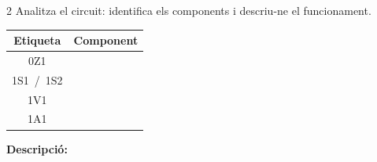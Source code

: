 \begin{exercici}[12]{2}
Analitza el circuit: identifica els components i descriu-ne el funcionament.
\begin{center}\circuitD\end{center}
\begin{center}
\renewcommand{\arraystretch}{2.0}
\begin{tabular}{|c|p{10cm}|}\hline
\textbf{Etiqueta} & \textbf{Component}\\\hline 0Z1 & \\\hline 1S1 \,/\, 1S2 & \\\hline 1V1 & \\\hline 1A1 & \\\hline
\end{tabular}
\end{center}
\textbf{Descripció:}
\end{exercici}

\newcommand{\circuitE}{%
\begin{tikzpicture}[x=1cm,y=1cm]
 \pncyl{a}{1.5}{6.0}{d}
 \pnvalve{v}{1.0}{3.2}{52}{pilot}{spring}
 \pnbutton{s1}{-2.2}{1.0}
 \draw[pn] (v-4)--(2.17,5.0)--(1.75,5.0)--(a-A);
 \draw[pn] (v-2)--(2.53,4.6)--(3.85,4.6)--(a-B);
 \draw[pn] (s1-2)--(-.85,3.65)--(.58,3.65);
 \draw[pn] (v-1)--(2.35,-.4);
 \draw[pn] (s1-1)--(-1.075,-.4);
 \draw[pn] (-2.2,-.4)--(2.35,-.4);
 \pnsource{-2.2}{-.4}{0}
 \pntag{-2.9}{-.4}{0Z1}\pntag{-1.9}{.45}{1S1}
 \pntag{.5}{2.75}{1V1}\pntag{4.9}{6.6}{1A1}
\end{tikzpicture}}

